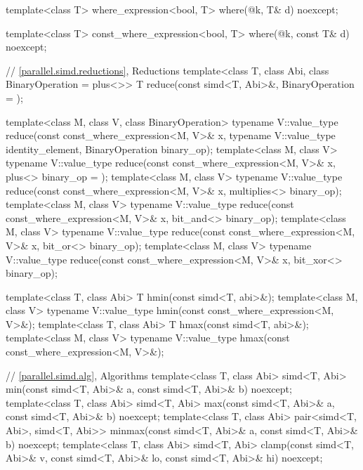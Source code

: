 \begin{codeblock}
{{  template<class T>
    where_expression<bool, T>
      where(@\seebelow@ k, T& d) noexcept;

  template<class T>
    const_where_expression<bool, T>
      where(@\seebelow@ k, const T& d) noexcept;

  // \ref{parallel.simd.reductions}, Reductions
  template<class T, class Abi, class BinaryOperation = plus<>>
    T reduce(const simd<T, Abi>&,
             BinaryOperation = {});

  template<class M, class V, class BinaryOperation>
    typename V::value_type reduce(const const_where_expression<M, V>& x,
                                  typename V::value_type identity_element,
                                  BinaryOperation binary_op);
  template<class M, class V>
    typename V::value_type reduce(const const_where_expression<M, V>& x,
                                  plus<> binary_op = {});
  template<class M, class V>
    typename V::value_type reduce(const const_where_expression<M, V>& x,
                                  multiplies<> binary_op);
  template<class M, class V>
    typename V::value_type reduce(const const_where_expression<M, V>& x,
                                  bit_and<> binary_op);
  template<class M, class V>
    typename V::value_type reduce(const const_where_expression<M, V>& x,
                                  bit_or<> binary_op);
  template<class M, class V>
    typename V::value_type reduce(const const_where_expression<M, V>& x,
                                  bit_xor<> binary_op);

  template<class T, class Abi>
    T hmin(const simd<T, abi>&);
  template<class M, class V>
    typename V::value_type hmin(const const_where_expression<M, V>&);
  template<class T, class Abi>
    T hmax(const simd<T, abi>&);
  template<class M, class V>
    typename V::value_type hmax(const const_where_expression<M, V>&);

  // \ref{parallel.simd.alg}, Algorithms
  template<class T, class Abi>
    simd<T, Abi>
      min(const simd<T, Abi>& a, const simd<T, Abi>& b) noexcept;
  template<class T, class Abi>
    simd<T, Abi>
      max(const simd<T, Abi>& a, const simd<T, Abi>& b) noexcept;
  template<class T, class Abi>
    pair<simd<T, Abi>, simd<T, Abi>>
      minmax(const simd<T, Abi>& a, const simd<T, Abi>& b) noexcept;
  template<class T, class Abi>
    simd<T, Abi>
      clamp(const simd<T, Abi>& v,
            const simd<T, Abi>& lo,
            const simd<T, Abi>& hi) noexcept;
}
}
\end{codeblock}

